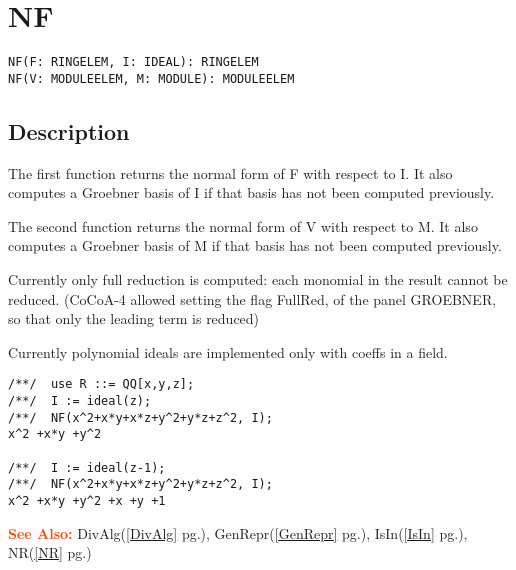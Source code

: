 \documentclass[a4paper]{mybook}
\newenvironment{command}{}{} %
\newcommand\SeeAlso{\par\textcolor{OrangeRed}{\textbf{\large See Also: }}}
\begin{document}
\section{NF}
\label{NF}
\begin{command} %


\begin{Verbatim}[label=syntax, rulecolor=\color{MidnightBlue},
frame=single]
NF(F: RINGELEM, I: IDEAL): RINGELEM
NF(V: MODULEELEM, M: MODULE): MODULEELEM
\end{Verbatim}


\subsection*{Description}

The first function returns the normal form of F with respect to I.
It also computes a Groebner basis of I if that basis has not been
computed previously.
\par 
The second function returns the normal form of V with respect to M. It
also computes a Groebner basis of M if that basis has not been
computed previously.
\par 
Currently only full reduction is computed: each monomial in
the result cannot be reduced.
(CoCoA-4 allowed setting the flag FullRed, of the panel GROEBNER,
so that only the leading term is reduced)
\par 
Currently polynomial ideals are implemented only with coeffs
in a field.
\begin{Verbatim}[label=example, rulecolor=\color{PineGreen}, frame=single]
/**/  use R ::= QQ[x,y,z];
/**/  I := ideal(z);
/**/  NF(x^2+x*y+x*z+y^2+y*z+z^2, I);
x^2 +x*y +y^2

/**/  I := ideal(z-1);
/**/  NF(x^2+x*y+x*z+y^2+y*z+z^2, I);
x^2 +x*y +y^2 +x +y +1
\end{Verbatim}


\SeeAlso %
  DivAlg(\ref{DivAlg} pg.\pageref{DivAlg}), 
    GenRepr(\ref{GenRepr} pg.\pageref{GenRepr}), 
    IsIn(\ref{IsIn} pg.\pageref{IsIn}), 
    NR(\ref{NR} pg.\pageref{NR})
\end{command} %
\end{document}
